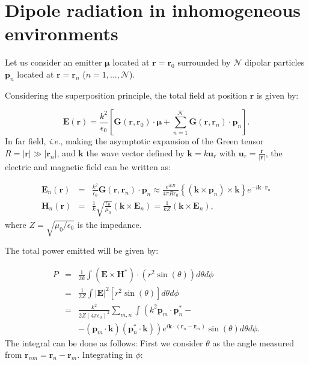 \section{Dipole radiation in inhomogeneous environments\label{App1:eval_dip_inh_env}}

Let us consider an emitter $\boldsymbol{\mu}$ located at $\mathbf{r} = \mathbf{r}_{0}$ surrounded by $\mathcal{N}$ dipolar particles $\mathbf{p}_n$ located at $\mathbf{r} = \mathbf{r}_{n}$ ($n = 1,...,\mathcal{N}$).

Considering the superposition principle, the total field at position $\mathbf{r}$ is given by:

\begin{equation}
\mathbf{E}\left(\mathbf{r}\right) = \frac{k^2}{\epsilon_{0}}\left[\mathbf{G}\left(\mathbf{r},\mathbf{r}_{0}\right)\cdot \boldsymbol{\mu} + \sum_{n=1}^{\mathcal{N}}\mathbf{G}\left(\mathbf{r},\mathbf{r}_{n}\right)\cdot \mathbf{p}_{n} \right].
\end{equation}
In far field, \textit{i.e.}, making the asymptotic expansion of the Green tensor $R = \left|\mathbf{r}\right| \gg \left|\mathbf{r}_{n}\right|$,  and $\mathbf{k}$ the wave vector defined by $\mathbf{k}=k \mathbf{u}_{r}$ with $\mathbf{u}_{r}=\frac{\mathbf{r}}{\left|\mathbf{r}\right|}$, the electric and magnetic field can be written as:

\begin{eqnarray}
\mathbf{E}_{n}\left(\mathbf{r}\right) & = & \frac{k^{2}}{\epsilon_{0}}\mathbf{G}\left(\mathbf{r},\mathbf{r}_{n}\right)\cdot\mathbf{p}_{n}\approx\frac{e^{ikR}}{4\pi R\epsilon_{0}}\left\{ \left(\mathbf{k}\times\mathbf{p}_{n}\right)\times\mathbf{k}\right\} e^{-i\mathbf{k}\cdot\mathbf{r}_{n}}\\
\mathbf{H}_{n}\left(\mathbf{r}\right) & = & \frac{1}{k}\sqrt{\frac{\epsilon_{0}}{\mu_{0}}}\left(\mathbf{k}\times\mathbf{E}_{n}\right)=\frac{1}{kZ}\left(\mathbf{k}\times\mathbf{E}_{n}\right),
\end{eqnarray}
where $Z=\sqrt{\mu_{0}/\epsilon_{0}}$ is the impedance.

The total power emitted will be given by:

\begin{eqnarray}
P & = & \frac{1}{2k}\int{\left(\mathbf{E}\times\mathbf{H}^{*}\right)}\cdot\left(r^{2}\sin\left(\theta\right)\right) d\theta d\phi \\
& = & \frac{1}{2Z}\int{\left|\mathbf{E}\right|^2\left[r^2\sin\left(\theta\right)\right]d\theta d\phi} \\
& = & \frac{k^{2}}{2Z\left(4\pi\epsilon_{0}\right)^{2}}\sum_{m,n}\int\left(k^{2}\mathbf{p}_{m}\cdot\mathbf{p}_{n}^{*} - \right. \nonumber\\
& & \left. -\left(\mathbf{p}_{m}\cdot\mathbf{k}\right)\left(\mathbf{p}_{n}^{*}\cdot\mathbf{k}\right)\right) e^{i\mathbf{k}\cdot\left( \mathbf{r}_{n}-\mathbf{r}_{m}\right)}\sin\left(\theta\right)d\theta d\phi.
\end{eqnarray}
The integral can be done as follows: First we consider $\theta$ as the angle measured from $\mathbf{r}_{nm}=\mathbf{r}_{n}-\mathbf{r}_{m}$. Integrating in $\phi$:

